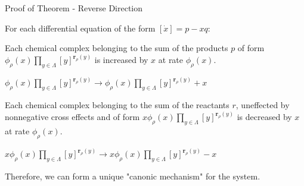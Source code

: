 \begin{frame}{Proof of Theorem - Reverse Direction}
    
        
  	For each differential equation of the form \([\dot x] = p - xq\):\newline
  	
  	Each chemical complex belonging to the sum of the products \(p\) of form \(\phi_{\rho}(x) \prod_{y \in \Lambda} [y]^{\textbf{r}_{\rho}(y)}\) is increased by \(x\) at rate \(\phi_{\rho}(x)\).\newline
    
    \(\phi_{\rho}(x) \prod_{y \in \Lambda} [y]^{\textbf{r}_{\rho}(y)} \to \phi_{\rho}(x) \prod_{y \in \Lambda} [y]^{\textbf{r}_{\rho}(y)} + x\) \newline
  	
  	Each chemical complex belonging to the sum of the reactants \(r\), uneffected by nonnegative cross effects and of form \(x\phi_{\rho}(x) \prod_{y \in \Lambda} [y]^{\textbf{r}_{\rho}(y)}\) is decreased by \(x\) at rate \(\phi_{\rho}(x)\).\newline
    
    \(x\phi_{\rho}(x) \prod_{y \in \Lambda} [y]^{\textbf{r}_{\rho}(y)} \to x\phi_{\rho}(x) \prod_{y \in \Lambda} [y]^{\textbf{r}_{\rho}(y)} -  x\)\newline
        
        
        
    Therefore, we can form a unique "canonic mechanism" for the system.
   
\end{frame}
